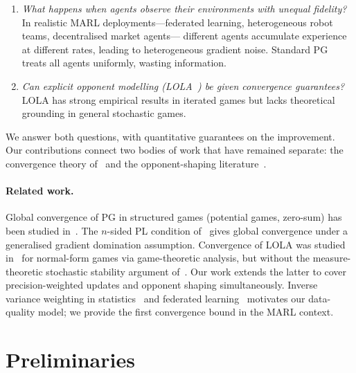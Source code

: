 \documentclass[10pt,letterpaper]{article}
\begin{document}
\vspace{-0.3em}
\begin{enumerate}
\item \emph{What happens when agents observe their environments with
  unequal fidelity?} In realistic MARL deployments---federated
  learning, heterogeneous robot teams, decentralised market agents---
  different agents accumulate experience at different rates, leading
  to heterogeneous gradient noise. Standard PG treats all agents
  uniformly, wasting information.
\item \emph{Can explicit opponent modelling (LOLA~\cite{foerster2018})
  be given convergence guarantees?} LOLA has strong empirical results
  in iterated games but lacks theoretical grounding in general
  stochastic games.
\end{enumerate}
\vspace{-0.3em}

We answer both questions, with quantitative guarantees on the
improvement. Our contributions connect two bodies of work that have
remained separate: the convergence theory of~\cite{giannou2022}
and the opponent-shaping literature~\cite{foerster2018,letcher2019}.

\paragraph{Related work.}
Global convergence of PG in structured games (potential games,
zero-sum) has been studied
in~\cite{leonardos2022,daskalakis2022}. The $n$-sided PL condition
of~\cite{chao2026} gives global convergence under a generalised
gradient domination assumption. Convergence of LOLA was studied
in~\cite{letcher2019} for normal-form games via game-theoretic
analysis, but without the measure-theoretic stochastic stability
argument of~\cite{giannou2022}. Our work extends the latter to
cover precision-weighted updates and opponent shaping simultaneously.
Inverse variance weighting in statistics~\cite{cochran1954} and
federated learning~\cite{li2020federated} motivates our data-quality
model; we provide the first convergence bound in the MARL context.

\section{Preliminaries}
\end{document}
